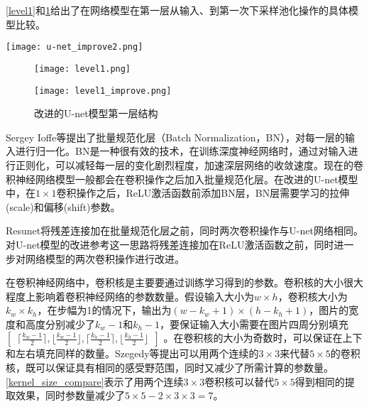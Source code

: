 \documentclass[AutoFakeBold]{LZUThesis}
\begin{document}
\cref{level1}和\cref{level1_improve}给出了在网络模型在第一层从输入、到第一次下采样池化操作的具体模型比较。
\begin{figure*}[htbp]
    \centering
    \texttt{[image: u-net\_improve2.png]}
    \caption{改进的U-net模型结构，矩形上方是对应的通道数}
    \label{model_improve}
\end{figure*}
\begin{figure}[htbp]
    \centering
    \begin{minipage}[t]{0.5\linewidth}  %
        \centering
        \texttt{[image: level1.png]}
        \caption{U-net模型第一层结构}
        \label{level1}
    \end{minipage}
    \hfill%
    \begin{minipage}[t]{0.5\linewidth}
        \centering
        \texttt{[image: level1\_improve.png]}
        \caption{改进的U-net模型第一层结构}
        \label{level1_improve}
    \end{minipage}
\end{figure}
\par

Sergey Ioffe\textsuperscript{\cite{ioffe2015batch}}等提出了批量规范化层（Batch Normalization，BN），对每一层的输入进行归一化。BN是一种很有效的技术，在训练深度神经网络时，通过对输入进行正则化，可以减轻每一层的变化剧烈程度，加速深层网络的收敛速度。现在的卷积神经网络模型一般都会在卷积操作之后加入批量规范化层。在改进的U-net模型中，在$1\times 1$卷积操作之后，ReLU激活函数前添加BN层，BN层需要学习的拉伸(scale)和偏移(shift)参数。

Resunet\textsuperscript{\cite{zhang2018road}}将残差连接加在批量规范化层之前，同时两次卷积操作与U-net网络相同。对U-net模型的改进参考这一思路将残差连接加在ReLU激活函数之前，同时进一步对网络模型的两次卷积操作进行改进。

在卷积神经网络中，卷积核是主要要通过训练学习得到的参数。卷积核的大小很大程度上影响着卷积神经网络的参数数量。假设输入大小为$w\times h$，卷积核大小为$k_w\times k_h$，在步幅为1的情况下，输出为$(w-k_w+1)\times (h- k_h+1)$，图片的宽度和高度分别减少了$k_w-1$和$k_h-1$，要保证输入大小需要在图片四周分别填充
$[\enspace\lceil \frac{k_w-1}{2}\rceil, \lfloor\frac{k_w-1}{2}\rfloor,\lceil \frac{k_h-1}{2}\rceil, \lfloor\frac{k_h-1}{2}\rfloor\enspace]$ 。在卷积核的大小为奇数时，可以保证在上下和左右填充同样的数量。Szegedy等\textsuperscript{\cite{szegedy2016rethinking}}提出可以用两个连续的$3\times 3$来代替$5\times 5$的卷积核，既可以保证具有相同的感受野范围，同时又减少了所需计算的参数量。\cref{kernel_size_compare}表示了用两个连续$3\times 3$卷积核可以替代$5\times 5$得到相同的提取效果，同时参数量减少了$5\times 5-2\times 3\times 3=7$。
\end{document}
